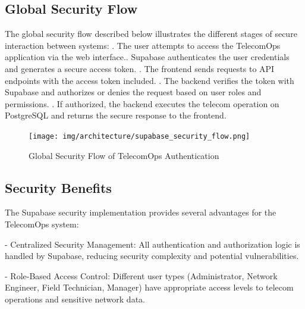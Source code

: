 \subsection{Global Security Flow}
The global security flow described below illustrates the different stages of secure interaction between systems:
. The user attempts to access the TelecomOps application via the web interface.. Supabase authenticates the user credentials and generates a secure access token. . The frontend sends requests to API endpoints with the access token included. . The backend verifies the token with Supabase and authorizes or denies the request based on user roles and permissions. . If authorized, the backend executes the telecom operation on PostgreSQL and returns the secure response to the frontend. \newline

\begin{figure}[H]
    \centering
    \texttt{[image: img/architecture/supabase\_security\_flow.png]}
    \caption{Global Security Flow of TelecomOps Authentication}
    \label{fig:security_flow}
\end{figure}

\subsection{Security Benefits}
The Supabase security implementation provides several advantages for the TelecomOps system:
\vspace{0.5cm} 
\newline

- Centralized Security Management: 
\vspace{0.2cm}
\newline
All authentication and authorization logic is handled by Supabase, reducing security complexity and potential vulnerabilities.
\vspace{0.5cm}
\newline

- Role-Based Access Control:
\vspace{0.2cm}
\newline
Different user types (Administrator, Network Engineer, Field Technician, Manager) have appropriate access levels to telecom operations and sensitive network data.
\vspace{0.5cm} 
\newline


